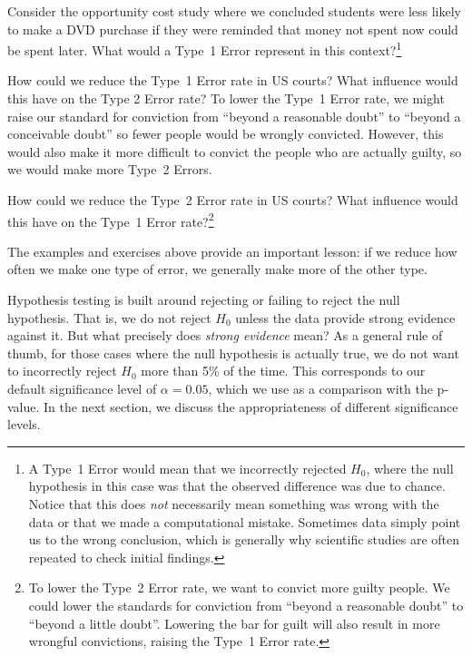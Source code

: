 \begin{exercise}
Consider the opportunity cost study where we concluded students were less likely to make a DVD purchase if they were reminded that money not spent now could be spent later. What would a Type~1 Error represent in this context?\footnote{A Type~1 Error would mean that we incorrectly rejected $H_0$, where the null hypothesis in this case was that the observed difference was due to chance. Notice that this does \emph{not} necessarily mean something was wrong with the data or that we made a computational mistake. Sometimes data simply point us to the wrong conclusion, which is generally why scientific studies are often repeated to check initial findings.}
\end{exercise}

\begin{example}{How could we reduce the Type~1 Error rate in US courts? What influence would this have on the Type 2 Error rate?}
To lower the Type~1 Error rate, we might raise our standard for conviction from ``beyond a reasonable doubt'' to ``beyond a conceivable doubt'' so fewer people would be wrongly convicted. However, this would also make it more difficult to convict the people who are actually guilty, so we would make more Type~2 Errors.
\end{example}

\begin{exercise} \label{howToReduceType2ErrorsInUSCourts}
How could we reduce the Type~2 Error rate in US courts? What influence would this have on the Type~1 Error rate?\footnote{To lower the Type~2 Error rate, we want to convict more guilty people. We could lower the standards for conviction from ``beyond a reasonable doubt'' to ``beyond a little doubt''. Lowering the bar for guilt will also result in more wrongful convictions, raising the Type~1 Error rate.}
\end{exercise}


The examples and exercises above provide an important lesson: if we reduce how often we make one type of error, we generally make more of the other type.

Hypothesis testing is built around rejecting or failing to reject the null hypothesis. That is, we do not reject $H_0$ unless the data provide strong evidence against it. But what precisely does \emph{strong evidence} mean? As a general rule of thumb, for those cases where the null hypothesis is actually true, we do not want to incorrectly reject $H_0$ more than 5\% of the time. This corresponds to our default significance level of $\alpha = 0.05$, which we use as a comparison with the p-value. In the next section, we discuss the appropriateness of different significance levels.


